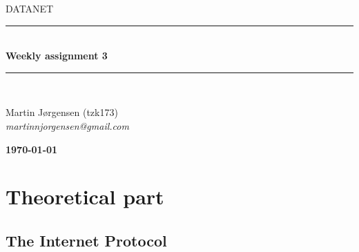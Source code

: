 \documentclass[10pt]{article}
\newcommand{\HRule}{\rule{\linewidth}{0.5mm}}
\begin{document}
\begin{titlepage}

\begin{center}

\textsc{\LARGE DATANET}\\[1.5cm]


\HRule \\[0.4cm]

{ \bfseries Weekly assignment 3}\\[1cm]

\HRule \\ [7.5cm]

\begin{minipage}{0.5\textwidth}
\begin{flushleft} \large
Martin Jørgensen (tzk173)\\
\textit{martinnjorgensen@gmail.com}\\
\end{flushleft}
\end{minipage}
\begin{minipage}{0.4\textwidth}
\begin{flushright} \large
\textbf{\today} \\
\end{flushright}
\end{minipage}

\vfill



\end{center}

\end{titlepage}
\clearpage

\section{Theoretical part}

\subsection{The Internet Protocol}
\end{document}

